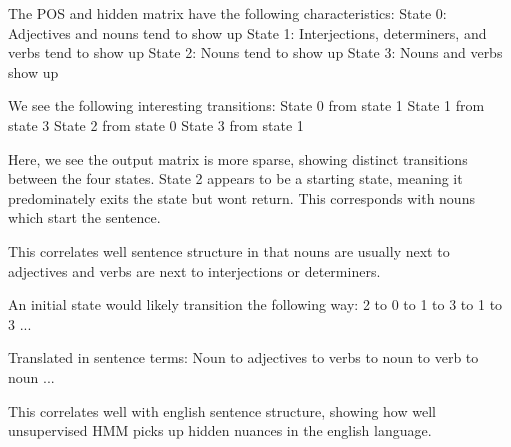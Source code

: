 The POS and hidden matrix have the following characteristics: \newline
State 0: Adjectives and nouns tend to show up \newline
State 1: Interjections, determiners, and verbs tend to show up \newline
State 2: Nouns tend to show up \newline
State 3: Nouns and verbs show up  \newline

We see the following interesting transitions: \newline
State 0 from state 1 \newline
State 1 from state 3 \newline
State 2 from state 0 \newline
State 3 from state 1 \newline

Here, we see the output matrix is more sparse, showing distinct transitions between the four states. State 2 appears to be a starting state, meaning it predominately exits the state but wont return. This corresponds with nouns which start the sentence.

This correlates well sentence structure in that nouns are usually next to adjectives and verbs are next to interjections or determiners.

An initial state would likely transition the following way:
2 to 0 to 1 to 3 to 1 to 3 ...

Translated in sentence terms:
Noun to adjectives to verbs to noun to verb to noun ...

This correlates well with english sentence structure, showing how well unsupervised HMM picks up hidden nuances in the english language.



